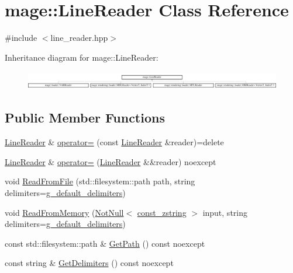 \hypertarget{classmage_1_1_line_reader}{}\section{mage\+:\+:Line\+Reader Class Reference}
\label{classmage_1_1_line_reader}


{\ttfamily \#include $<$line\+\_\+reader.\+hpp$>$}

Inheritance diagram for mage\+:\+:Line\+Reader\+:\begin{figure}[H]
\begin{center}
\leavevmode
\includegraphics[height=0.821114cm]{classmage_1_1_line_reader}
\end{center}
\end{figure}
\subsection*{Public Member Functions}
\begin{DoxyCompactItemize}
\item 
\mbox{\hyperlink{classmage_1_1_line_reader}{Line\+Reader}} \& \mbox{\hyperlink{classmage_1_1_line_reader_a2247078d0b5602f9a9a6b74019832faf}{operator=}} (const \mbox{\hyperlink{classmage_1_1_line_reader}{Line\+Reader}} \&reader)=delete
\item 
\mbox{\hyperlink{classmage_1_1_line_reader}{Line\+Reader}} \& \mbox{\hyperlink{classmage_1_1_line_reader_a3ba691cb32a1ab5dcbe75498068c1b86}{operator=}} (\mbox{\hyperlink{classmage_1_1_line_reader}{Line\+Reader}} \&\&reader) noexcept
\item 
void \mbox{\hyperlink{classmage_1_1_line_reader_ad4236487534d5dba6582613317317092}{Read\+From\+File}} (std\+::filesystem\+::path path, string delimiters=\mbox{\hyperlink{namespacemage_aa161198415efd9349da6187663250aea}{g\+\_\+default\+\_\+delimiters}})
\item 
void \mbox{\hyperlink{classmage_1_1_line_reader_a5aa9068792817b6d6dc840a44b788159}{Read\+From\+Memory}} (\mbox{\hyperlink{namespacemage_a8769f9d670d6b585ea306cb1062af94b}{Not\+Null}}$<$ \mbox{\hyperlink{namespacemage_abfd9206dc607ceb5d13ec68bf075a5c0}{const\+\_\+zstring}} $>$ input, string delimiters=\mbox{\hyperlink{namespacemage_aa161198415efd9349da6187663250aea}{g\+\_\+default\+\_\+delimiters}})
\item 
const std\+::filesystem\+::path \& \mbox{\hyperlink{classmage_1_1_line_reader_a9740b3cecdcf5a27c696a08eef3b09da}{Get\+Path}} () const noexcept
\item 
const string \& \mbox{\hyperlink{classmage_1_1_line_reader_aa00e1e27b614e11ec9f70e52d0bac551}{Get\+Delimiters}} () const noexcept
\end{DoxyCompactItemize}
